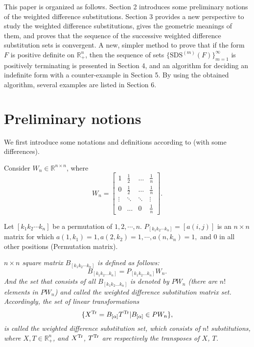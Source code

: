 \documentclass [10pt,a4paper]{article}
\begin{document}
 This paper is organized as follows. Section 2
introduces some preliminary notions of the weighted
dif\mbox{}ference substitutions. Section 3 provides a new
perspective  to study the weighted dif\mbox{}ference substitutions,
gives the geometric meanings  of them, and  proves that the sequence
of the successive  weighted dif\mbox{}ference
 substitution sets
is convergent.  A new, simpler method to prove that if the form  $F$
is positive def\mbox{}inite on $\mathbb{R}_+^n$, then the sequence
of sets $\{\textrm{SDS}^{(m)}(F)\}_{m=1}^\infty$ is positively
terminating is presented in Section 4, and an algorithm for deciding
an indef\mbox{}inite form with a counter-example in Section 5. By
using the obtained algorithm, several examples are listed in Section
6.





\section{Preliminary  notions}

We first introduce some notations and def\mbox{}initions according
to \cite{Yong:1} (with some differences).

  Consider $W_n\in \mathbb{R}^{n\times n}$,  where
\begin{equation}\label{eee}
W_n = \left[
\begin{array}{cccc}
1 & \frac{1}{2}& \ldots & \frac{1}{n} \\
0 & \frac{1}{2} & \ldots & \frac{1}{n}\\
\vdots & \ddots& \ddots& \vdots\\
0 & \ldots & 0 & \frac{1}{n}
\end{array} \right].
\end{equation}

Let $[k_1k_2\cdots k_n]$ be a permutation of $1, 2, \cdots, n$.
$P_{[k_1k_2\cdots k_n]}= [a(i,j)]$ is an $n \times n$ matrix for
which $a(1,k_1) = 1, a(2,k_2) = 1,\cdots, a(n,k_n) = 1, $ and 0 in
all other positions (Permutation matrix).

\begin{definition}
\emph{ $n \times n$ square matrix $B_{[k_1k_2\cdots k_n]}$ is
defined as follows:
 \begin{displaymath}
B_{[k_1k_2...k_n]}=P_{[k_1k_2...k_n]}W_n.
\end{displaymath}
And the set that consists of all $B_{[k_1k_2...k_n]}$ is denoted by
$PW_n$ (there are $n!$ elements in $PW_n$) and called the weighted
dif\mbox{}ference
 substitution matrix set.   Accordingly, the set of
linear transformations
\begin{displaymath}
\{X^{\textmd{Tr}}=B_{[\alpha]}T^{\textmd{Tr}}|B_{[\alpha]}\in
PW_n\},
\end{displaymath} is called  the weighted dif\mbox{}ference  substitution
set, which consists of $n!$ substitutions, where $X, T\in
\mathbb{R}_{+}^{n}$, and $X^{\textmd{Tr}}$, $T^{\textmd{Tr}}$ are
respectively the transposes of $X$, $T$. }
 \end{definition}
\end{document}
